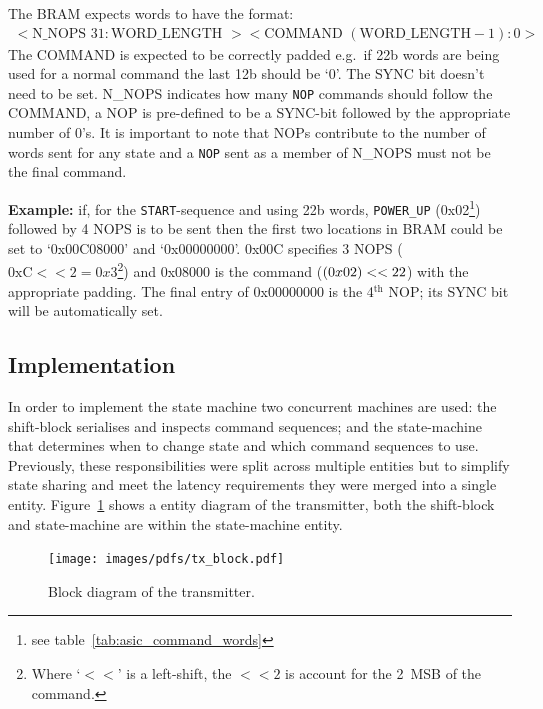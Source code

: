 The BRAM expects words to have the format:
\begin{align}\label{fmt:tx_bram}
  <\text{N\_NOPS } 31:\text{WORD\_LENGTH }><\text{COMMAND } (\text{WORD\_LENGTH} - 1):0>
\end{align}
The COMMAND is expected to be correctly padded e.g.\ if 22b words are being used for a normal command the last 12b should be `0'. The SYNC bit doesn't need to be set. N\_NOPS indicates how many \texttt{NOP} commands should follow the COMMAND, a NOP is pre-defined to be a SYNC-bit followed by the appropriate number of 0's. It is important to note that NOPs contribute to the number of words sent for any state and a \texttt{NOP} sent as a member of N\_NOPS must not be the final command.

\textbf{Example:} if, for the \texttt{START}-sequence and using 22b words, \texttt{POWER\_UP} (0x02\footnote{see table~\ref{tab:asic_command_words}}) followed by 4 NOPS is to be sent then the first two locations in BRAM could be set to `0x00C08000' and `0x00000000'. 0x00C specifies 3 NOPS (\(\text{0xC}<<2 = 0x3\)\footnote{Where `\(<<\)' is a left-shift, the \( <<2 \) is account for the 2~MSB of the command.}) and 0x08000 is the command (\(\text(0x02) << 22 \)) with the appropriate padding. The final entry of 0x00000000 is the 4\(^{\text{th}}\) NOP; its SYNC bit will be automatically set.
\subsection{Implementation} %
\label{sub:tx_implementation}

In order to implement the state machine two concurrent machines are used: the shift-block serialises and inspects command sequences; and the state-machine that determines when to change state and which command sequences to use. Previously, these responsibilities were split across multiple entities but to simplify state sharing and meet the latency requirements they were merged into a single entity. Figure~\ref{fig:tx_entity} shows a entity diagram of the transmitter, both the shift-block and state-machine are within the state-machine entity.
    
\begin{figure}[htbp]
  \centering
  \texttt{[image: images/pdfs/tx\_block.pdf]}
  \caption{Block diagram of the transmitter.}
  \label{fig:tx_entity}
\end{figure}
        
